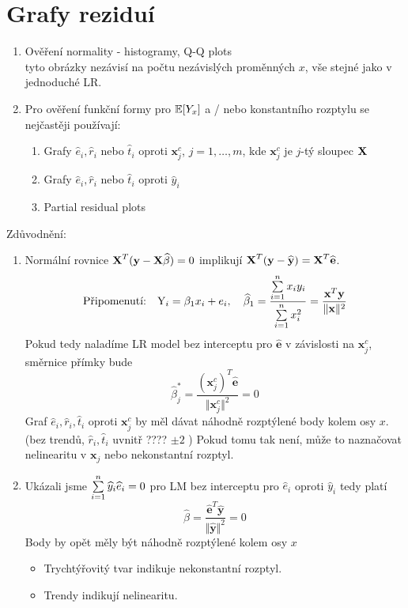 \section{Grafy reziduí}
\begin{enumerate}
\item Ověření normality - histogramy, Q-Q plots \\
tyto obrázky nezávisí na počtu nezávislých proměnných $ x $, vše stejné jako v jednoduché LR.
\item Pro ověření funkční formy pro $ \mathbb{E} [ Y_x ] $ a / nebo konstantního rozptylu se nejčastěji používají:
\begin{enumerate}
\item Grafy $ \widehat{e}_i , \widehat{r}_i $ nebo $ \widehat{t}_i $ oproti $ \textbf{x}_j^c $, $ j = 1, \dots , m $, kde $ \textbf{x}_j^c $ je $ j $-tý sloupec $ \textbf{X} $
\item  Grafy $ \widehat{e}_i , \widehat{r}_i $ nebo $ \widehat{t}_i $ oproti $ \widehat{y}_i $
\item Partial residual plots
\end{enumerate}
\end{enumerate}

\begin{remark}
Zdůvodnění:
\begin{enumerate}
\item Normální rovnice $ \textbf{X} ^{T} ( \textbf{y} - \textbf{X} \widehat{\beta} ) = 0 $ implikují $ \textbf{X} ^{T} ( \textbf{y} - \widehat{\textbf{y}}) = \textbf{X} ^T \widehat{\textbf{e}} $.
$$
 \text{Připomenutí:} \quad \text{Y}_i = \beta_1 x_i + e_i , \quad \widehat{\beta}_1 = \dfrac{\sum\limits_{i=1}^{n} x_i y_i}{\sum\limits_{i=1}^{n} x_i^{2}} = \frac{\textbf{x}^{T}\textbf{y}}{\Vert \textbf{x} \Vert ^2 }
$$
Pokud tedy naladíme LR model bez interceptu pro $ \widehat{\textbf{e}} $ v závislosti na $ \textbf{x}_j^c $, směrnice přímky bude
$$
  \widehat{\beta}_j^* = \frac{(\textbf{x}_j^c)^T \widehat{\textbf{e}}}{\Vert \textbf{x}_j^c \Vert ^2} = 0
$$
Graf $ \widehat{e}_i , \widehat{r}_i , \widehat{t}_i $ oproti $ \textbf{x}_j^c $ by měl dávat náhodně rozptýlené body kolem osy $ x $. (bez trendů, $  \widehat{r}_i , \widehat{t}_i $ uvnitř ???? $\pm 2$ )
Pokud tomu tak není, může to naznačovat nelinearitu v $ \textbf{x}_j $ nebo nekonstantní rozptyl.
\item Ukázali jsme $ \sum\limits_{i=1}^{n} \widehat{y}_i \widehat{e}_i = 0 $ pro LM bez interceptu pro $ \widehat{e}_i $ oproti $ \widehat{y}_i $ tedy platí
$$
  \widehat{\beta} = \frac{\widehat{\textbf{e}}^T \widehat{\textbf{y}}}{\Vert \widehat{\textbf{y}} \Vert ^2} = 0
$$
Body by opět měly být náhodně rozptýlené kolem osy $ x $
\begin{itemize}
\item Trychtýřovitý tvar indikuje nekonstantní rozptyl.
\item Trendy indikují nelinearitu.
\end{itemize}
\end{enumerate}	
\end{remark}

